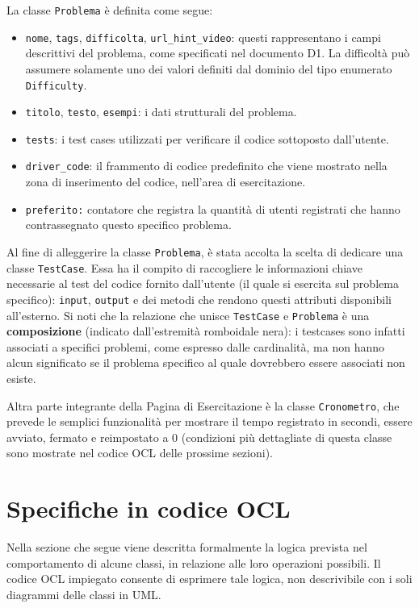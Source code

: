 \documentclass[11pt, a4paper]{article}
\theoremstyle{definition} %
\begin{document}
\noindent La classe \texttt{Problema} è definita come segue:
\begin{itemize}
    \item \texttt{nome}, \texttt{tags}, \texttt{difficolta}, \texttt{url\_hint\_video}:
    questi rappresentano i campi descrittivi del problema, come specificati nel
    documento D1. La difficoltà può assumere solamente uno dei valori
    definiti dal dominio del tipo enumerato \texttt{Difficulty}.

    \item \texttt{titolo}, \texttt{testo}, \texttt{esempi}: i dati strutturali del problema.

    \item \texttt{tests}: i test cases utilizzati per verificare il codice
    sottoposto dall'utente.

    \item \texttt{driver\_code}: il frammento di codice predefinito che
    viene mostrato nella zona di inserimento del codice, nell'area di
    esercitazione.

    \item \texttt{preferito:} contatore che registra la quantità di utenti
    registrati che hanno contrassegnato questo specifico problema.
\end{itemize}
Al fine di alleggerire la classe \texttt{Problema}, è stata accolta la scelta di
dedicare una classe \texttt{TestCase}. Essa ha il compito di raccogliere le informazioni
chiave necessarie al test del codice fornito dall'utente (il quale si esercita
sul problema specifico): \texttt{input}, \texttt{output} e dei metodi che rendono
questi attributi disponibili all'esterno.
Si noti che la relazione che unisce \texttt{TestCase} e \texttt{Problema} è
una \textbf{composizione} (indicato dall'estremità romboidale nera): i testcases
sono infatti associati a specifici problemi, come espresso dalle cardinalità,
ma non hanno alcun significato se il problema specifico al quale dovrebbero
essere associati non esiste.

Altra parte integrante della Pagina di Esercitazione è la classe \texttt{Cronometro},
che prevede le semplici funzionalità per mostrare il tempo registrato in secondi,
essere avviato, fermato e reimpostato a 0 (condizioni più dettagliate
di questa classe sono mostrate nel codice OCL delle prossime sezioni).



\newpage
\section{Specifiche in codice OCL}
Nella sezione che segue viene descritta formalmente la logica prevista
nel comportamento di alcune classi, in relazione alle loro operazioni
possibili. Il codice OCL impiegato consente di esprimere tale logica,
non descrivibile con i soli diagrammi delle classi in UML.
\end{document}
